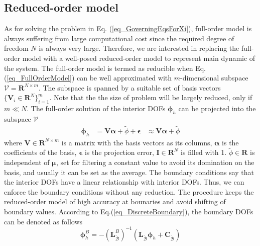 \documentclass[preprint, 10pt]{elsarticle}
\begin{document}
\subsection{Reduced-order model}
\label{sec_ROM}
As for solving the problem in Eq. (\ref{eq_GoverningEqsForXi}), full-order model is always suffering from large computational cost since the required degree of freedom $N$ is always very large.  Therefore, we are interested in replacing the full-order model with a well-posed  reduced-order model to represent main dynamic of the system. The full-order model is termed as reducible when Eq. (\ref{eq_FullOrderModel}) can be well approximated with $m$-dimensional subspace $\mathcal{V}=\mathbf{R}^{N \times m}$. The subspace is spanned by a suitable set of basis vectors $\{\mathbf{V}_i \in \mathbf{R}^{N} \}_{i=1}^m$.  Note that the the size of problem will be largely reduced, only if $m \ll N$. The full-order solution of the interior DOFs $\pmb{\phi} _h$ can be projected into the subspace $\mathcal{V}$
\begin{equation}
\begin{aligned}
\pmb{\phi} _h  &   =   \mathbf{V} \pmb{\alpha} + \tilde{\phi} + \pmb{\epsilon}
               &\approx \mathbf{V} \pmb{\alpha} + \tilde{\phi}
\end{aligned}
\label{eq_projection}
\end{equation}
where $\mathbf{V} \in \mathbf{R}^{N\times m}$ is a matrix with the basis vectors as its columns, $\pmb{\alpha}$ is   the coefficients of the basis, $\pmb{\epsilon}$ is the projection error, $\mathbf{I} \in \mathbf{R}^{N}$ is filled with 1.  $\tilde{\phi} \in \mathbf{R}$ is independent of $\pmb{\mu}$, set for filtering a constant value to avoid its domination on the basis, and usually it can be set as the average. The boundary conditions say that the interior DOFs have a linear relationship with interior DOFs. Thus, we can enforce the boundary conditions without any reduction. The procedure keeps the reduced-order model of high accuracy at bounaries and avoid shifting of boundary values. According to Eq.(\ref{eq_DiscreteBoundary}), the boundary DOFs can be denoted as follows
\begin{equation}
\pmb{\phi}_h^{B} = -( \mathbf{L}_{\widetilde {\mathcal{B}}}^{B} )^{-1}
\left(
\mathbf{L}_{\widetilde {\mathcal{B}}} \pmb{\phi}_h +
\mathbf{C}_{\widetilde {\mathcal{B}}}
\right)
\label{eq_DerivePhiB}
\end{equation}
\end{document}
